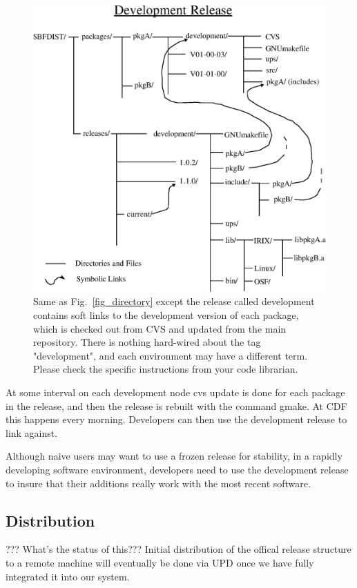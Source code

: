 \documentclass[12pt]{article}
\begin{document}
\begin{figure}[tbh]
\centerline{\includegraphics[width=4.5in]{development_release.eps}}
\caption[Development Release Directory Structure]{ 
Same as Fig.~\ref{fig_directory} except the release called development
contains soft links to the development version of each package, which is 
checked out from CVS and updated from the main repository. There is nothing
hard-wired about the tag "development", and each environment may have a 
different term. Please check the specific instructions from your code 
librarian.}
\label{fig_development_release}
\end{figure}

At some interval on each development node 
{\ttfamily cvs update}  is done for each package in the release, and 
then the release is rebuilt with the command {\ttfamily gmake}.  At
CDF this happens every morning. Developers
can then use the development release to link against.  

Although naive users may want to use a frozen release for stability, 
in a rapidly developing software environment, developers need to use 
the development release to insure that their additions really work with
the most recent software.  

\subsection{Distribution}
??? What's the status of this???
Initial distribution of the offical release structure to a remote machine will 
eventually be done via UPD once we have fully integrated it into our system.
\end{document}
